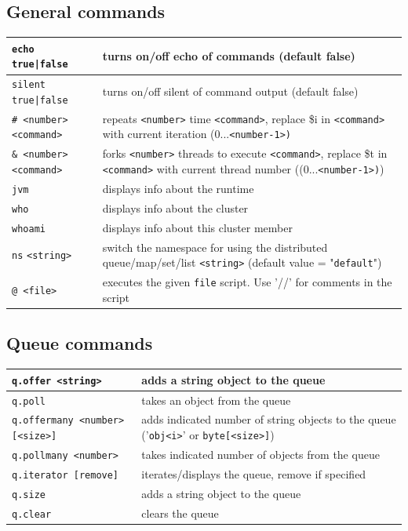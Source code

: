 \subsection*{General commands}
\begin{tabular}{|p{}|p{}|}
    \hline
    \texttt{echo true|false} & turns on/off echo of commands (default false)\\\hline
    \texttt{silent true|false} & turns on/off silent of command output (default false)\\\hline
    \texttt{\# <number> <command>}& repeats \texttt{<number>} time \texttt{<command>}, replace \$i in \texttt{<command>} with current iteration (0...\texttt{<number-1>)}\\\hline
    \texttt{\& <number> <command>}& forks \texttt{<number>} threads to execute \texttt{<command>}, replace \$t in \texttt{<command>} with current thread number ((0...\texttt{<number-1>)})\\\hline
    \texttt{jvm} & displays info about the runtime\\\hline
    \texttt{who} & displays info about the cluster\\\hline
    \texttt{whoami} & displays info about this cluster member\\\hline
    \texttt{ns} \texttt{<string>} & switch the namespace for using the distributed queue/map/set/list \texttt{<string>} \newline (default value = "\texttt{default}")\\\hline
    \texttt{@ <file>} & executes the given \texttt{file} script. Use '//' for comments in the script\\\hline
\end{tabular}
\subsection*{Queue commands}
\begin{tabular}{|p{}|p{}|}
    \hline
    \texttt{q.offer <string>} & adds a string object to the queue\\\hline
    \texttt{q.poll} & takes an object from the queue\\\hline
    \texttt{q.offermany <number> [<size>]} & adds indicated number of string objects to the queue ('\texttt{obj<i>}' or \texttt{byte[<size>]})\\\hline
    \texttt{q.pollmany <number>} & takes indicated number of objects from the queue\\\hline
    \texttt{q.iterator [remove]} & iterates/displays the queue, remove if specified\\\hline
    \texttt{q.size} & adds a string object to the queue\\\hline
    \texttt{q.clear} & clears the queue\\\hline
\end{tabular}
